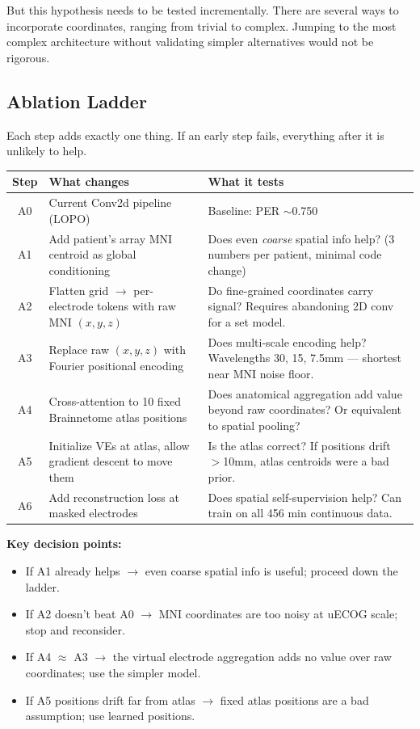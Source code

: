 \documentclass[11pt]{article}
\begin{document}
But this hypothesis needs to be tested incrementally. There are several ways to incorporate coordinates, ranging from trivial to complex. Jumping to the most complex architecture without validating simpler alternatives would not be rigorous.

\subsection{Ablation Ladder}

Each step adds exactly one thing. If an early step fails, everything after it is unlikely to help.

\begin{center}
\small
\begin{tabularx}{\textwidth}{c>{\raggedright\arraybackslash}p{5cm}>{\raggedright\arraybackslash}X}
\toprule
Step & What changes & What it tests \\
\midrule
A0 & Current Conv2d pipeline (LOPO) & Baseline: PER $\sim$0.750 \\[0.3em]
A1 & Add patient's array MNI centroid as global conditioning & Does even \textit{coarse} spatial info help? (3 numbers per patient, minimal code change) \\[0.3em]
A2 & Flatten grid $\to$ per-electrode tokens with raw MNI $(x,y,z)$ & Do fine-grained coordinates carry signal? Requires abandoning 2D conv for a set model. \\[0.3em]
A3 & Replace raw $(x,y,z)$ with Fourier positional encoding & Does multi-scale encoding help? Wavelengths 30, 15, 7.5mm --- shortest near MNI noise floor. \\[0.3em]
A4 & Cross-attention to 10 fixed Brainnetome atlas positions & Does anatomical aggregation add value beyond raw coordinates? Or equivalent to spatial pooling? \\[0.3em]
A5 & Initialize VEs at atlas, allow gradient descent to move them & Is the atlas correct? If positions drift $>$10mm, atlas centroids were a bad prior. \\[0.3em]
A6 & Add reconstruction loss at masked electrodes & Does spatial self-supervision help? Can train on all 456 min continuous data. \\
\bottomrule
\end{tabularx}
\end{center}

\textbf{Key decision points:}
\begin{itemize}[nosep]
    \item If A1 already helps $\to$ even coarse spatial info is useful; proceed down the ladder.
    \item If A2 doesn't beat A0 $\to$ MNI coordinates are too noisy at uECOG scale; stop and reconsider.
    \item If A4 $\approx$ A3 $\to$ the virtual electrode aggregation adds no value over raw coordinates; use the simpler model.
    \item If A5 positions drift far from atlas $\to$ fixed atlas positions are a bad assumption; use learned positions.
\end{itemize}
\end{document}
